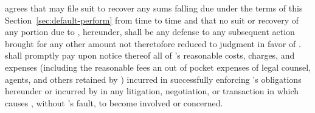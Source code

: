 \lessee agrees that \lessor may file suit to recover any sums falling due under the terms of this Section~\ref{sec:default-perform} from time to time and that no suit or recovery of any portion due to \lessor, hereunder, shall be any defense to any subsequent action brought for any other amount not theretofore reduced to judgment in favor of \lessor. \lessee shall promptly pay upon notice thereof all of \lessor's reasonable costs, charges, and expenses (including the reasonable fees an out of pocket expenses of legal counsel, agents, and others retained by \lessor) incurred in successfully enforcing \lessee's obligations hereunder or incurred by \lessor in any litigation, negotiation, or transaction in which \lessee causes \lessor, without \lessor's fault, to become involved or concerned.
